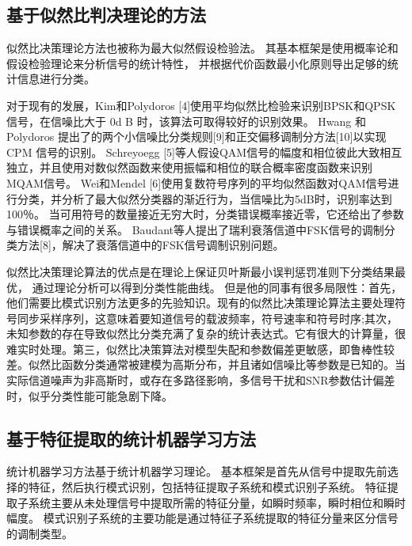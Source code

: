 \subsection{基于似然比判决理论的方法}

似然比决策理论方法也被称为最大似然假设检验法。 
其基本框架是使用概率论和假设检验理论来分析信号的统计特性，
并根据代价函数最小化原则导出足够的统计信息进行分类。\par

对于现有的发展，Kim和Polydoros [4]使用平均似然比检验来识别BPSK和QPSK信号，在信噪比大于 0d B 时，该算法可取得较好的识别效果。
Hwang 和 Polydoros 提出了的两个小信噪比分类规则[9]和正交偏移调制分方法[10]以实现 CPM 信号的识别。
Schreyoegg [5]等人假设QAM信号的幅度和相位彼此大致相互独立，并且使用对数似然函数来使用振幅和相位的联合概率密度函数来识别MQAM信号。 
Wei和Mendel [6]使用复数符号序列的平均似然函数对QAM信号进行分类，并分析了最大似然分类器的渐近行为，当信噪比为5dB时，识别率达到100％。
当可用符号的数量接近无穷大时，分类错误概率接近零，它还给出了参数与错误概率之间的关系。
Baudant等人提出了瑞利衰落信道中FSK信号的调制分类方法[8]，解决了衰落信道中的FSK信号调制识别问题。\par
 
似然比决策理论算法的优点是在理论上保证贝叶斯最小误判惩罚准则下分类结果最优，
通过理论分析可以得到分类性能曲线。
但是他的同事有很多局限性：首先，他们需要比模式识别方法更多的先验知识。现有的似然比决策理论算法主要处理符号同步采样序列，这意味着要知道信号的载波频率，符号速率和符号时序;其次，未知参数的存在导致似然比分类充满了复杂的统计表达式。它有很大的计算量，很难实时处理。第三，似然比决策算法对模型失配和参数偏差更敏感，即鲁棒性较差。似然比函数分类通常被建模为高斯分布，并且诸如信噪比等参数是已知的。当实际信道噪声为非高斯时，或存在多路径影响，多信号干扰和SNR参数估计偏差时，似乎分类性能可能急剧下降。\par
 
\subsection{基于特征提取的统计机器学习方法}

统计机器学习方法基于统计机器学习理论。 基本框架是首先从信号中提取先前选择的特征，然后执行模式识别，包括特征提取子系统和模式识别子系统。 特征提取子系统主要从未处理信号中提取所需的特征分量，如瞬时频率，瞬时相位和瞬时幅度。 模式识别子系统的主要功能是通过特征子系统提取的特征分量来区分信号的调制类型。 \par

